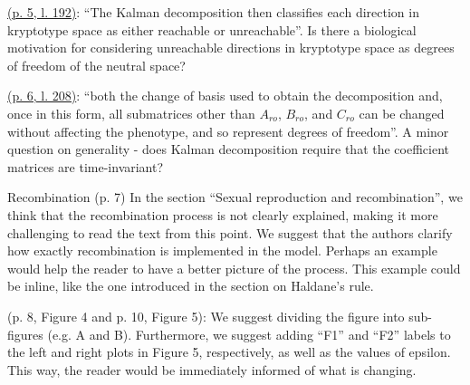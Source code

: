 \reply{
}

\begin{point}{}
  \hyperlink{rev2:3}{(p. 5, l. 192)}: ``The Kalman decomposition then classifies each direction in kryptotype space as either reachable or unreachable''. Is there a biological motivation for considering unreachable directions in kryptotype space as degrees of freedom of the neutral space?
\end{point}

\reply{
}

\begin{point}{}
\hyperlink{rev2:4}{(p. 6, l. 208)}: ``both the change of basis used to obtain the decomposition and, once in this form, all submatrices other than $A_{ro}$, $B_{ro}$, and $C_{ro}$ can be changed without affecting the phenotype, and so represent degrees of freedom''. A minor question on generality - does Kalman decomposition require that the coefficient matrices are time-invariant?
\end{point}


\begin{point}{Recombination}
(p. 7) In the section ``Sexual reproduction and recombination'', we think that the recombination process is not clearly explained, making it more challenging to read the text from this point. We suggest that the authors clarify how exactly recombination is implemented in the model. Perhaps an example would help the reader to have a better picture of the process. This example could be inline, like the one introduced in the section on Haldane's rule.
\end{point}

\reply{
}

\begin{point}{}
(p. 8, Figure 4 and p. 10, Figure 5): We suggest dividing the figure into sub-figures (e.g. A and B). Furthermore, we suggest adding ``F1'' and ``F2'' labels to the left and right plots in Figure 5, respectively, as well as the values of epsilon. This way, the reader would be immediately informed of what is changing.
\end{point}

\reply{
}

